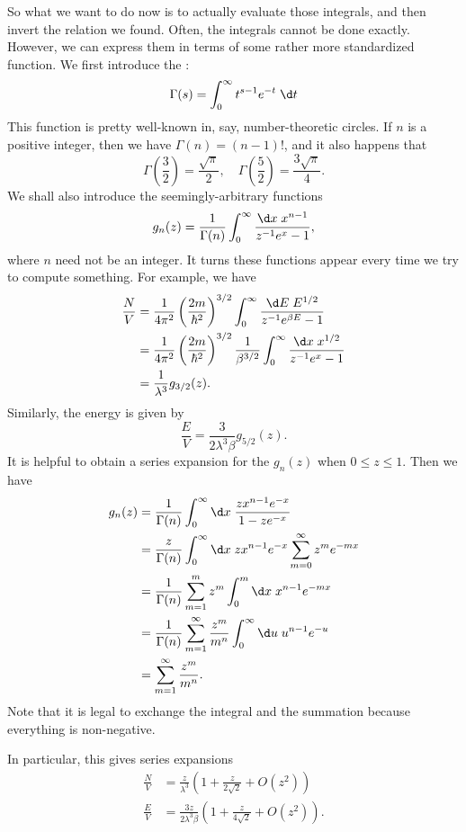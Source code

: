 \documentclass[a4paper]{article}
\begin{document}
So what we want to do now is to actually evaluate those integrals, and then invert the relation we found. Often, the integrals cannot be done exactly. However, we can express them in terms of some rather more standardized function. We first introduce the :
\[
  \Gamma(s) = \int_0^\infty t^{s - 1} e^{-t} \;\d t
\]
This function is pretty well-known in, say, number-theoretic circles. If $n$ is a positive integer, then we have $\Gamma(n) = (n - 1)!$, and it also happens that
\[
  \Gamma\left(\frac{3}{2}\right) = \frac{\sqrt{\pi}}{2},\quad \Gamma\left(\frac{5}{2}\right) = \frac{3\sqrt{\pi}}{4}.
\]
We shall also introduce the seemingly-arbitrary functions
\[
  g_n(z) = \frac{1}{\Gamma(n)} \int_0^\infty \frac{\d x\; x^{n - 1}}{z^{-1} e^x - 1},
\]
where $n$ need not be an integer. It turns these functions appear every time we try to compute something. For example, we have
\begin{align*}
  \frac{N}{V} &= \frac{1}{4\pi^2} \left(\frac{2m}{\hbar^2}\right)^{3/2} \int_0^\infty \frac{\d E\; E^{1/2}}{z^{-1} e^{\beta E} - 1}\\
  &= \frac{1}{4\pi^2} \left(\frac{2m}{\hbar^2}\right)^{3/2} \frac{1}{\beta^{3/2}} \int_0^\infty \frac{\d x\;x^{1/2}}{z^{-1}e^x - 1}\\
  &= \frac{1}{\lambda^3} g_{3/2}(z).
\end{align*}
Similarly, the energy is given by
\[
  \frac{E}{V} = \frac{3}{2\lambda^3 \beta} g_{5/2}(z).
\]
It is helpful to obtain a series expansion for the $g_n(z)$ when $0 \leq z \leq 1$. Then we have
\begin{align*}
  g_n(z) &= \frac{1}{\Gamma(n)} \int_0^\infty \d x\; \frac{z x^{n - 1} e^{-x}}{1 - z e^{-x}}\\
  &= \frac{z}{\Gamma(n)} \int_0^\infty \d x\; z x^{n - 1} e^{-x} \sum_{m = 0}^\infty z^m e^{-mx}\\
  &= \frac{1}{\Gamma(n)} \sum_{m = 1}^m z^m \int_0^m \d x\; x^{n - 1} e^{-mx}\\
  &= \frac{1}{\Gamma(n)} \sum_{m = 1}^\infty \frac{z^m}{m^n}\int_0^\infty \d u\; u^{n - 1} e^{-u}\\
  &= \sum_{m = 1}^\infty \frac{z^m}{m^n}.
\end{align*}
Note that it is legal to exchange the integral and the summation because everything is non-negative.

In particular, this gives series expansions
\begin{align*}
  \frac{N}{V} &= \frac{z}{\lambda^3} \left(1 + \frac{z}{2\sqrt{2}} + O(z^2)\right)\\
  \frac{E}{V} &= \frac{3z}{2\lambda^3 \beta}\left(1 + \frac{z}{4\sqrt{2}} + O(z^2)\right).
\end{align*}
\end{document}
